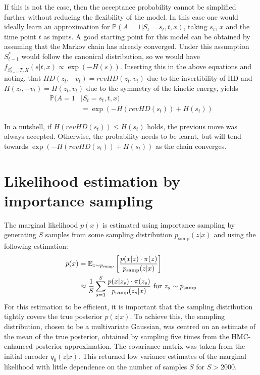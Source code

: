 \begin{appendices}
If this is not the case, then the acceptance probability cannot be simplified further without reducing the flexibility of the model. In this case one would ideally learn an approximation for $\mathbb{P}(A=1|S_t = s_t, t, x)$, taking $s_t$, $x$ and the time point $t$ as inputs. A good starting point for this model can be obtained by assuming that the Markov chain has already converged. Under this assumption $S_{t-1}^*$ would follow the canonical distribution, so we would have $f_{S^*_{t-1}|T, X}(s| t, x) \propto \exp(-H(s))$. Inserting this in the above equations and noting, that $HD(z_t, -v_t) = revHD(z_t, v_t)$ due to the invertibility of HD and $H(z_t, -v_t) = H(z_t, v_t)$ due to the symmetry of the kinetic energy, yields
\begin{equation}
\begin{split}
\mathbb{P}(A = 1&|S_t = s_t, t, x) \\
&= \exp(-H(revHD(s_t)) + H(s_t))
\end{split}
\end{equation}

In a nutshell, if $H(revHD(s_t)) \leq H(s_t)$ holds, the previous move was always accepted. Otherwise, the probability needs to be learnt, but will tend towards $\exp(-H(revHD(s_t)) + H(s_t))$ as the chain converges.

\section{Likelihood estimation by importance sampling}
\label{app:NLLestimateImportSampling}

The marginal likelihood $p(x)$ is estimated using importance sampling by generating $S$ samples from some sampling distribution $p_\textrm{samp}(z|x)$ and using the following estimation:
\begin{equation}
\begin{split}
p(x) &= \mathbb{E}_{z \sim p_\textrm{samp}} \left[\frac{p(x|z) \cdot \pi(z)}{p_\textrm{samp}(z|x)} \right] \\
&\approx \frac{1}{S} \sum_{s=1}^S \frac{p(x|z_s) \cdot \pi(z_s)}{p_\textrm{samp}(z_s|x)} \textrm{ for } z_s \sim p_\textrm{samp}
\end{split}
\end{equation}
For this estimation to be efficient, it is important that the sampling distribution tightly covers the true posterior $p(z|x)$. To achieve this, the sampling distribution, chosen to be a multivariate Gaussian, was centred on an estimate of the mean of the true posterior, obtained by sampling five times from the HMC-enhanced posterior approximation. The covariance matrix was taken from the initial encoder $q_0(z|x)$. This returned low variance estimates of the marginal likelihood with little dependence on the number of samples $S$ for $S > 2000$.


\end{appendices}
